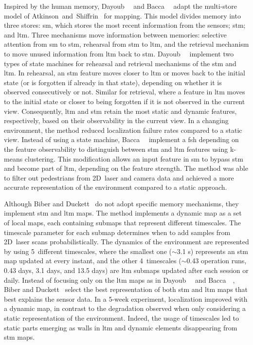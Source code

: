 Inspired by the human memory, Dayoub~\etal~\cite{dayoub:ras:2011} and
Bacca~\etal~\cite{bacca:ras:2013} adapt the multi-store model of
Atkinson~and~Shiffrin~\cite{atkinson-shiffrin:inbook:1968} for mapping.
This model divides memory into three stores: \gls{sm}, which stores the most
recent information from the sensors; \gls{stm}; and \gls{ltm}.
Three mechanisms move information between memories:
selective attention from \gls{sm} to \gls{stm},
rehearsal from \gls{stm} to \gls{ltm}, and the retrieval mechanism to move
unused information from \gls{ltm} back to \gls{stm}.
Dayoub~\etal~\cite{dayoub:ras:2011} implement two types of state machines
for rehearsal and retrieval mechanisms of the \gls{stm} and \gls{ltm}.
In rehearsal, an \gls{stm} feature moves closer to \gls{ltm}
or moves back to the initial state (or is forgotten if already in that state),
depending on whether it is observed consecutively or not.
Similar for retrieval, where a feature in \gls{ltm} moves to the initial state
or closer to being forgotten if it is not observed in the current view.
Consequently, \gls{ltm} and \gls{stm} retain
the most static and dynamic features, respectively,
based on their observability in the current view.
In a changing environment, the method reduced localization failure rates
compared to a static view. Instead of using a state machine,
Bacca~\etal~\cite{bacca:ras:2013} implement a \gls{fsh}
depending on the feature observability to distinguish between
\gls{stm} and \gls{ltm} features using k-means clustering.
This modification allows an input feature in \gls{sm} to bypass \gls{stm}
and become part of \gls{ltm}, depending on the feature strength.
The method was able to filter out pedestrians from 2D~laser and camera data
and achieved a more accurate representation of the environment
compared to a static approach.

Although Biber and Duckett~\cite{biber-duckett:ijrr:2009}
do not adopt specific memory mechanisms,
they implement \gls{stm} and \gls{ltm} maps.
The method implements a dynamic map as a set of local maps,
each containing submaps that represent different timescales.
The timescale parameter for each submap determines when to add samples
from 2D~laser scans probabilistically.
The dynamics of the environment are represented by using 5~different timescales,
where the smallest one ($\sim$3.1 s) represents an \gls{stm} map
updated at every instant, and the other 4~timescales
($\sim$0.43 operation runs, 0.43 days, 3.1 days, and 13.5 days) are \gls{ltm} submaps
updated after each session or daily.
Instead of focusing only on the \gls{ltm} maps as in
Dayoub~\etal~\cite{dayoub:ras:2011} and Bacca~\etal~\cite{bacca:ras:2013},
Biber and Duckett~\cite{biber-duckett:ijrr:2009} select the best representation
of both \gls{stm} and \gls{ltm} maps that best explains the sensor data.
In a 5-week experiment, localization improved with a dynamic map,
in contrast to the degradation observed when only considering
a static representation of the environment.
Indeed, the usage of timescales led to static parts emerging as walls
in \gls{ltm} and dynamic elements disappearing from \gls{stm} maps.

